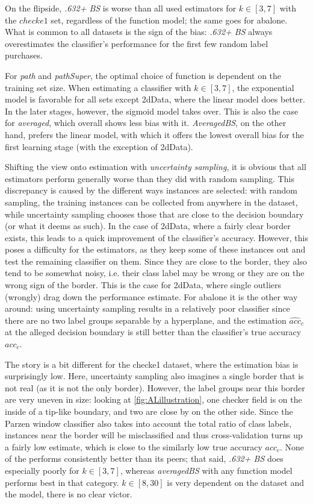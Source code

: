 On the flipside, \textit{.632+ BS} is worse than all used estimators for $k \in [3,7]$ with the $checke1$ set, regardless of the function model; the same goes for abalone. What is common to all datasets is the sign of the bias: \textit{.632+ BS} always overestimates the classifier's performance for the first few random label purchases.

For \textit{path} and \textit{pathSuper}, the optimal choice of function is dependent on the training set size. When estimating a classifier with $k \in [3, 7]$, the exponential model is favorable for all sets except 2dData, where the linear model does better. In the later stages, however, the sigmoid model takes over. This is also the case for \textit{averaged}, which overall shows less bias with it. \textit{AveragedBS}, on the other hand, prefers the linear model, with which it offers the lowest overall bias for the first learning stage (with the exception of 2dData).

Shifting the view onto estimation with \textit{uncertainty sampling}, it is obvious that all estimators perform generally worse than they did with random sampling. This discrepancy is caused by the different ways instances are selected: with random sampling, the training instances can be collected from anywhere in the dataset, while uncertainty sampling chooses those that are close to the decision boundary (or what it deems as such). In the case of 2dData, where a fairly clear border exists, this leads to a quick improvement of the classifier's accuracy. However, this poses a difficulty for the estimators, as they keep some of these instances out and test the remaining classifier on them. Since they are close to the border, they also tend to be somewhat noisy, i.e. their class label may be wrong or they are on the wrong sign of the border. This is the case for 2dData, where single outliers (wrongly) drag down the performance estimate. For abalone it is the other way around: using uncertainty sampling results in a relatively poor classifier since there are no two label groups separable by a hyperplane, and the estimation $\widehat{acc}_c$ at the alleged decision boundary is still better than the classifier's true accuracy $acc_c$.

The story is a bit different for the checke1 dataset, where the estimation bias is surprisingly low. Here, uncertainty sampling also imagines a single border that is not real (as it is not the only border). However, the label groups near this border are very uneven in size: looking at \ref{fig:ALillustration}, one checker field is on the inside of a tip-like boundary, and two are close by on the other side. Since the Parzen window classifier also takes into account the total ratio of class labels, instances near the border will be misclassified and thus cross-validation turns up a fairly low estimate, which is close to the similarly low true accuracy $acc_c$. None of the performs consistently better than its peers; that said, \textit{.632+ BS} does especially poorly for $k \in [3,7]$, whereas \textit{averagedBS} with any function model performs best in that category. $k \in [8, 30]$ is very dependent on the dataset and the model, there is no clear victor.


